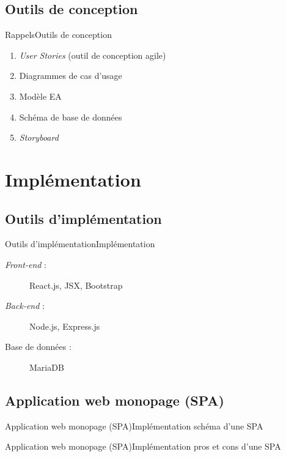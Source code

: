 \documentclass[usenames,dvipsnames]{beamer}
\begin{document}
\subsection{Outils de conception}
\begin{frame}{Rappels}{Outils de conception}
  \begin{enumerate}
    \item \textit{User Stories} (outil de conception agile)
    \item Diagrammes de cas d'usage
    \item Modèle EA
    \item Schéma de base de données
    \item \textit{Storyboard}
  \end{enumerate}
\end{frame}
\section{Implémentation}
\subsection{Outils d'implémentation}
\begin{frame}{Outils d'implémentation}{Implémentation}
  \begin{description}
    \item [\textit{Front-end} :] React.js, JSX, Bootstrap
    \item [\textit{Back-end} :] Node.js, Express.js
    \item [Base de données :] MariaDB
  \end{description}
\end{frame}

\subsection{Application web monopage (SPA)}
\begin{frame}{Application web monopage (SPA)}{Implémentation}
schéma d'une SPA
\end{frame}

\begin{frame}{Application web monopage (SPA)}{Implémentation}
pros et cons d'une SPA
\end{frame}
\end{document}
